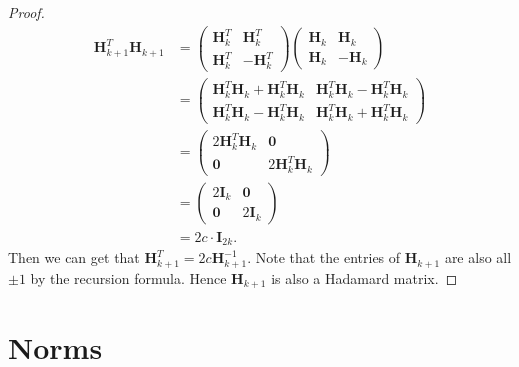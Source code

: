 \begin{enumerate}
{\begin{proof}
    $$
    \begin{aligned}
    \bm{H}_{k+1}^{T} \bm{H}_{k+1} & = \left(\begin{array}{cc}
        \bm{H}_{k}^T &  \bm{H}_{k}^T\\
         \bm{H}_{k}^T& -\bm{H}_{k}^T
    \end{array}\right)  \left(\begin{array}{cc}
        \bm{H}_{k} &  \bm{H}_{k}\\
         \bm{H}_{k} & -\bm{H}_{k}
    \end{array}\right)\\
    &= \left(\begin{array}{cc}
         \bm{H}_{k}^T \bm{H}_{k} + \bm{H}_{k}^T\bm{H}_{k}& \bm{H}_{k}^T \bm{H}_{k}-\bm{H}_{k}^T \bm{H}_{k} \\
         \bm{H}_{k}^T \bm{H}_{k} - \bm{H}_{k}^T \bm{H}_{k}& \bm{H}_{k}^T \bm{H}_{k}+\bm{H}_{k}^T \bm{H}_{k} 
    \end{array}\right) \\
    &= \left( \begin{array}{cc}
         2\bm{H}_{k}^T \bm{H}_k& \bm{0} \\
         \bm{0}& 2\bm{H}_{k}^T \bm{H}_k 
    \end{array} \right) \\
    &= \left( \begin{array}{cc}
         2\bm{I}_k & \bm{0} \\
         \bm{0}& 2\bm{I}_k 
    \end{array} \right) \\
    &= 2c \cdot \bm{I}_{2k}.
    \end{aligned}
    $$
    Then we can get that $\bm{H}_{k+1}^{T} = 2c \bm{H}_{k+1}^{-1}$. Note that the entries of $\bm{H}_{k+1}$ are also all $\pm 1$ by the recursion formula. Hence $\bm{H}_{k+1}$ is also a Hadamard matrix.
    \end{proof}
    }
\end{enumerate}

\chapter{Norms}

